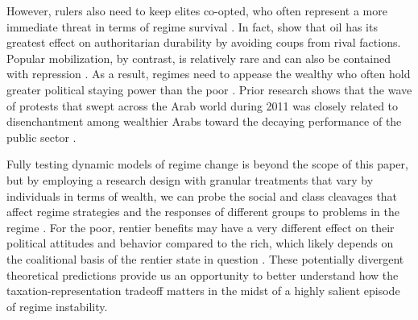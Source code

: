 \documentclass[12pt, letterpaper]{article}
\begin{document}
However, rulers also need to keep elites co-opted, who often represent a more immediate threat in terms of regime survival \parencite{gehlbach_investment_2011,marinov_coups_2014,ansell_inequality_2014}.  In fact, \textcite{geddes_autocratic_2014} show that oil has its greatest effect on authoritarian durability by avoiding coups from rival factions. Popular mobilization, by contrast, is relatively rare and can also be contained with repression \parencite{bellin_robustness_2004}. As a result, regimes need to appease the wealthy who often hold greater political staying power than the poor \parencite{waterbury_egypt_1983,waldner_state_1999,haber_politics_2003}. Prior research shows that the wave of protests that swept across the Arab world during 2011 was closely related to disenchantment among wealthier Arabs toward the decaying performance of the public sector \parencite{diwan_understanding_2013}. 

Fully testing dynamic models of regime change is beyond the scope of this paper, but by employing a research design with granular treatments that vary by individuals in terms of wealth, we can probe the social and class cleavages that affect regime strategies and the responses of different groups to problems in the regime \parencite{magaloni_voting_2006, de_la_o_conditional_2013,haggard_inequality_2012}. For the poor, rentier benefits may have a very different effect on their political attitudes and behavior compared to the rich, which likely depends on the coalitional basis of the rentier state in question \parencite{waldner_state_1999}. These potentially divergent theoretical predictions provide us an opportunity to better understand how the taxation-representation tradeoff matters in the midst of a highly salient episode of regime instability.

\end{document}
